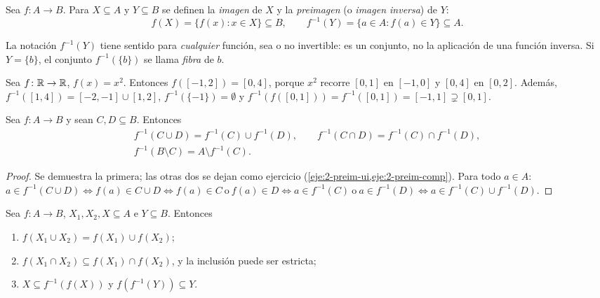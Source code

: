 \begin{definicion}\label{def:t2-imagen}
Sea $f\colon A\to B$. Para $X\subseteq A$ y $Y\subseteq B$ se definen la \emph{imagen} de $X$ y la \emph{preimagen} (o \emph{imagen inversa}) de $Y$:
\[
f(X)=\{f(x): x\in X\}\subseteq B,\qquad f^{-1}(Y)=\{a\in A: f(a)\in Y\}\subseteq A.
\]
\end{definicion}

La notación $f^{-1}(Y)$ tiene sentido para \emph{cualquier} función, sea o no invertible: es un conjunto, no la aplicación de una función inversa. Si $Y=\{b\}$, el conjunto $f^{-1}(\{b\})$ se llama \emph{fibra} de $b$.

\begin{ejemplo}\label{ej:t2-cuadrado}
Sea $f\colon\mathbb{R}\to\mathbb{R}$, $f(x)=x^{2}$. Entonces $f([-1,2])=[0,4]$, porque $x^{2}$ recorre $[0,1]$ en $[-1,0]$ y $[0,4]$ en $[0,2]$. Además, $f^{-1}([1,4])=[-2,-1]\cup[1,2]$, $f^{-1}(\{-1\})=\emptyset$ y $f^{-1}(f([0,1]))=f^{-1}([0,1])=[-1,1]\supsetneq[0,1]$.
\end{ejemplo}

\begin{teorema}\label{teo:t2-preimagen}
Sea $f\colon A\to B$ y sean $C,D\subseteq B$. Entonces
\begin{gather*}
f^{-1}(C\cup D)=f^{-1}(C)\cup f^{-1}(D),\qquad f^{-1}(C\cap D)=f^{-1}(C)\cap f^{-1}(D),\\
f^{-1}(B\setminus C)=A\setminus f^{-1}(C).
\end{gather*}
\end{teorema}

\begin{proof}
Se demuestra la primera; las otras dos se dejan como ejercicio (\cref{eje:2-preim-ui,eje:2-preim-comp}). Para todo $a\in A$:
$a\in f^{-1}(C\cup D)\iff f(a)\in C\cup D\iff f(a)\in C\ \text{o}\ f(a)\in D\iff a\in f^{-1}(C)\ \text{o}\ a\in f^{-1}(D)\iff a\in f^{-1}(C)\cup f^{-1}(D)$.
\end{proof}

\begin{teorema}\label{teo:t2-imagen}
Sea $f\colon A\to B$, $X_1,X_2,X\subseteq A$ e $Y\subseteq B$. Entonces
\begin{enumerate}
  \item $f(X_1\cup X_2)=f(X_1)\cup f(X_2)$;
  \item $f(X_1\cap X_2)\subseteq f(X_1)\cap f(X_2)$, y la inclusión puede ser estricta;
  \item $X\subseteq f^{-1}(f(X))$ y $f(f^{-1}(Y))\subseteq Y$.
\end{enumerate}
\end{teorema}

